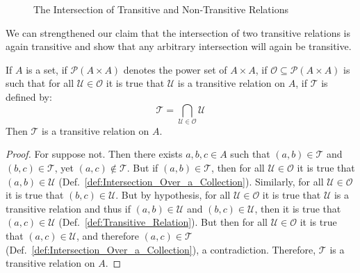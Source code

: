     \begin{figure}[H]
        \centering
        \captionsetup{type=figure}
        \begin{subfigure}[b]{0.49\textwidth}
            \centering
            
            \label{fig:Trans_Intersect_Non_Trans_May_Not_Be_Trans}
        \end{subfigure}
        \hfill
        \begin{subfigure}[b]{0.49\textwidth}
            \centering
            
            \label{fig:Trans_Int_Trans_May_Not_Be_Trans}
        \end{subfigure}
        \label{fig:Intersection_of_Transitive_and_Non_Transitive_Relations}
        \caption{The Intersection of Transitive and Non-Transitive Relations}
    \end{figure}
    We can strengthened our claim that the intersection of two transitive
    relations is again transitive and show that any arbitrary intersection will
    again be transitive.
    \begin{theorem}
        \label{thm:Intersection_of_Transitive_is_Transitive}%
        If $A$ is a set, if $\mathcal{P}(A\times{A})$ denotes the power set of
        $A\times{A}$, if $\mathcal{O}\subseteq\mathcal{P}(A\times{A})$ is such
        that for all $\mathcal{U}\in\mathcal{O}$ it is true that $\mathcal{U}$
        is a transitive relation on $A$, if $\mathcal{T}$ is defined by:
        \begin{equation}
            \mathcal{T}=\bigcap_{\mathcal{U}\in\mathcal{O}}\mathcal{U}
        \end{equation}
        Then $\mathcal{T}$ is a transitive relation on $A$.
    \end{theorem}
    \begin{proof}
        For suppose not. Then there exists $a,b,c\in{A}$ such that
        $(a,b)\in\mathcal{T}$ and $(b,c)\in\mathcal{T}$, yet
        $(a,c)\notin\mathcal{T}$. But if $(a,b)\in\mathcal{T}$, then for all
        $\mathcal{U}\in\mathcal{O}$ it is true that $(a,b)\in\mathcal{U}$
        (Def.~\ref{def:Intersection_Over_a_Collection}). Similarly, for all
        $\mathcal{U}\in\mathcal{O}$ it is true that $(b,c)\in\mathcal{U}$.
        But by hypothesis, for all $\mathcal{U}\in\mathcal{O}$ it is true that
        $\mathcal{U}$ is a transitive relation and thus if $(a,b)\in\mathcal{U}$
        and $(b,c)\in\mathcal{U}$, then it is true that $(a,c)\in\mathcal{U}$
        (Def.~\ref{def:Transitive_Relation}). But then for all
        $\mathcal{U}\in\mathcal{O}$ it is true that $(a,c)\in\mathcal{U}$, and
        therefore $(a,c)\in\mathcal{T}$
        (Def.~\ref{def:Intersection_Over_a_Collection}), a contradiction.
        Therefore, $\mathcal{T}$ is a transitive relation on $A$.
    \end{proof}
